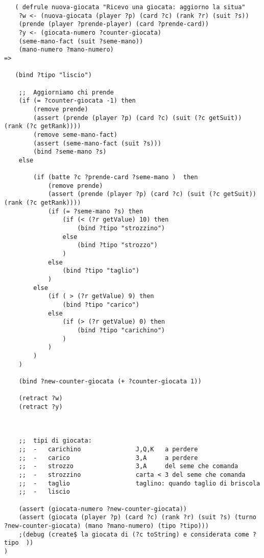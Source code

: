 \lstset{numbers=left, numberstyle=\tiny, stepnumber=1,firstnumber=1,
  numbersep=5pt,language=Lisp,
stringstyle=\ttfamily,
basicstyle=\footnotesize, 
showstringspaces=false,
breaklines=true
}


\begin{lstlisting}
   ( defrule nuova-giocata "Ricevo una giocata: aggiorno la situa"
    ?w <- (nuova-giocata (player ?p) (card ?c) (rank ?r) (suit ?s))
    (prende (player ?prende-player) (card ?prende-card))
    ?y <- (giocata-numero ?counter-giocata)
    (seme-mano-fact (suit ?seme-mano))
    (mano-numero ?mano-numero)
=>

   (bind ?tipo "liscio") 

    ;;  Aggiorniamo chi prende
    (if (= ?counter-giocata -1) then
        (remove prende)
        (assert (prende (player ?p) (card ?c) (suit (?c getSuit)) (rank (?c getRank))))
        (remove seme-mano-fact)
        (assert (seme-mano-fact (suit ?s)))
        (bind ?seme-mano ?s)
    else

        (if (batte ?c ?prende-card ?seme-mano )  then
            (remove prende)
            (assert (prende (player ?p) (card ?c) (suit (?c getSuit)) (rank (?c getRank))))
            (if (= ?seme-mano ?s) then
                (if (< (?r getValue) 10) then
                    (bind ?tipo "strozzino")
                else
                    (bind ?tipo "strozzo")
                )
            else
                (bind ?tipo "taglio")
            )
        else
            (if ( > (?r getValue) 9) then
                (bind ?tipo "carico")
            else
                (if (> (?r getValue) 0) then
                    (bind ?tipo "carichino")
                )
            )
        )
    )

    (bind ?new-counter-giocata (+ ?counter-giocata 1))

    (retract ?w)
    (retract ?y)



    ;;  tipi di giocata:
    ;;  -   carichino               J,Q,K   a perdere
    ;;  -   carico                  3,A     a perdere
    ;;  -   strozzo                 3,A     del seme che comanda
    ;;  -   strozzino               carta < 3 del seme che comanda
    ;;  -   taglio                  taglino: quando taglio di briscola
    ;;  -   liscio

    (assert (giocata-numero ?new-counter-giocata))
    (assert (giocata (player ?p) (card ?c) (rank ?r) (suit ?s) (turno ?new-counter-giocata) (mano ?mano-numero) (tipo ?tipo)))
    ;(debug (create$ la giocata di (?c toString) e considerata come ?tipo  ))
)

\end{lstlisting} 
